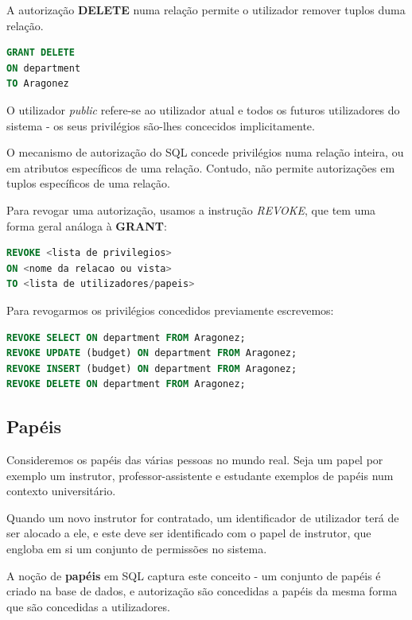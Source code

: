 \documentclass[oneside]{book}
\theoremstyle{definition}
\begin{document}
A autorização \textbf{DELETE} numa relação permite o utilizador remover tuplos duma relação.
\begin{lstlisting}[language=SQL, morekeywords={REFERENCES, TO}, framesep=8pt, xleftmargin=40pt, framexleftmargin=40pt, frame=tb, framerule=0pt]
GRANT DELETE
ON department
TO Aragonez
\end{lstlisting}

O utilizador \textit{public} refere-se ao utilizador atual e todos os futuros utilizadores do sistema - os seus privilégios são-lhes concecidos implicitamente.

O mecanismo de autorização do SQL concede privilégios numa relação inteira, ou em atributos específicos de uma relação. Contudo, não permite autorizações em tuplos específicos de uma relação.

Para revogar uma autorização, usamos a instrução \textit{REVOKE}, que tem uma forma geral análoga à \textbf{GRANT}:
\begin{lstlisting}[language=SQL, morekeywords={REFERENCES, REFRESH, MATERIALIZED, CONCURRENTLY}, framesep=8pt, xleftmargin=40pt, framexleftmargin=40pt, frame=tb, framerule=0pt]
REVOKE <lista de privilegios>
ON <nome da relacao ou vista>
TO <lista de utilizadores/papeis>
\end{lstlisting}

Para revogarmos os privilégios concedidos previamente escrevemos:
\begin{lstlisting}[language=SQL, morekeywords={REFERENCES, REFRESH, MATERIALIZED, CONCURRENTLY}, framesep=8pt, xleftmargin=40pt, framexleftmargin=40pt, frame=tb, framerule=0pt]
REVOKE SELECT ON department FROM Aragonez;
REVOKE UPDATE (budget) ON department FROM Aragonez;
REVOKE INSERT (budget) ON department FROM Aragonez;
REVOKE DELETE ON department FROM Aragonez;
\end{lstlisting}

\subsection{Papéis}
Consideremos os papéis das várias pessoas no mundo real. Seja um papel por exemplo um instrutor, professor-assistente e estudante exemplos de papéis num contexto universitário. 

Quando um novo instrutor for contratado, um identificador de utilizador terá de ser alocado a ele, e este deve ser identificado com o papel de instrutor, que engloba em si um conjunto de permissões no sistema.

A noção de \textbf{papéis} em SQL captura este conceito - um conjunto de papéis é criado na base de dados, e autorização são concedidas a papéis da mesma forma que são concedidas a utilizadores.
\end{document}
